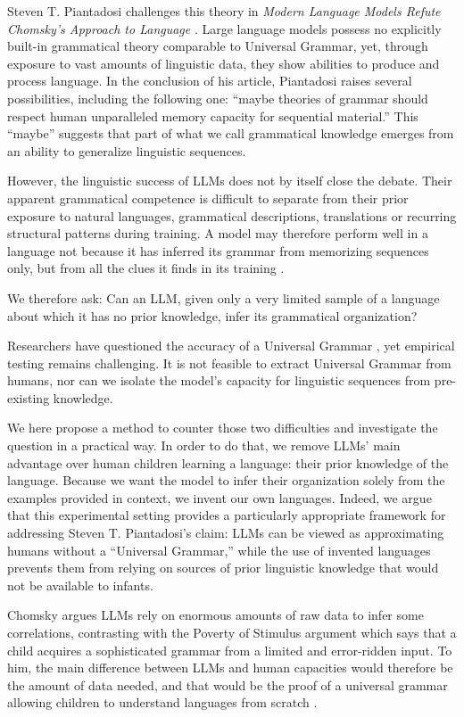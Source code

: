\documentclass[11pt]{article}
\begin{document}
Steven T. Piantadosi challenges this theory in \emph{Modern Language Models Refute Chomsky's Approach to Language} \citep{piantadosi2024}. Large language models possess no explicitly built-in grammatical theory comparable to Universal Grammar, yet, through exposure to vast amounts of linguistic data, they show abilities to produce and process language. In the conclusion of his article, Piantadosi raises several possibilities, including the following one: ``maybe theories of grammar should respect human unparalleled memory capacity for sequential material.'' This ``maybe'' suggests that part of what we call grammatical knowledge emerges from an ability to generalize linguistic sequences.

However, the linguistic success of LLMs does not by itself close the debate. Their apparent grammatical competence is difficult to separate from their prior exposure to natural languages, grammatical descriptions, translations or recurring structural patterns during training. A model may therefore perform well in a language not because it has inferred its grammar from memorizing sequences only, but from all the clues it finds in its training \citep{millierebuckner2026}.~

We therefore ask: Can an LLM, given only a very limited sample of a language about which it has no prior knowledge, infer its grammatical organization?~

Researchers have questioned the accuracy of a Universal Grammar \citep{sveinsson2023}, yet empirical testing remains challenging. It is not feasible to extract Universal Grammar from humans, nor can we isolate the model's capacity for linguistic sequences from pre-existing knowledge.~

We here propose a method to counter those two difficulties and investigate the question in a practical way. In order to do that, we remove LLMs' main advantage over human children learning a language: their prior knowledge of the language. Because we want the model to infer their organization solely from the examples provided in context, we invent our own languages. Indeed, we argue that this experimental setting provides a particularly appropriate framework for addressing Steven T. Piantadosi’s claim: LLMs can be viewed as approximating humans without a “Universal Grammar,” while the use of invented languages prevents them from relying on sources of prior linguistic knowledge that would not be available to infants.~

Chomsky argues LLMs rely on enormous amounts of raw data to infer some correlations, contrasting with the Poverty of Stimulus argument which says that a child acquires a sophisticated grammar from a limited and error-ridden input. To him, the main difference between LLMs and human capacities would therefore be the amount of data needed, and that would be the proof of a universal grammar allowing children to understand languages from scratch \citep{chomskyrobertswatumull2023}.
\end{document}
